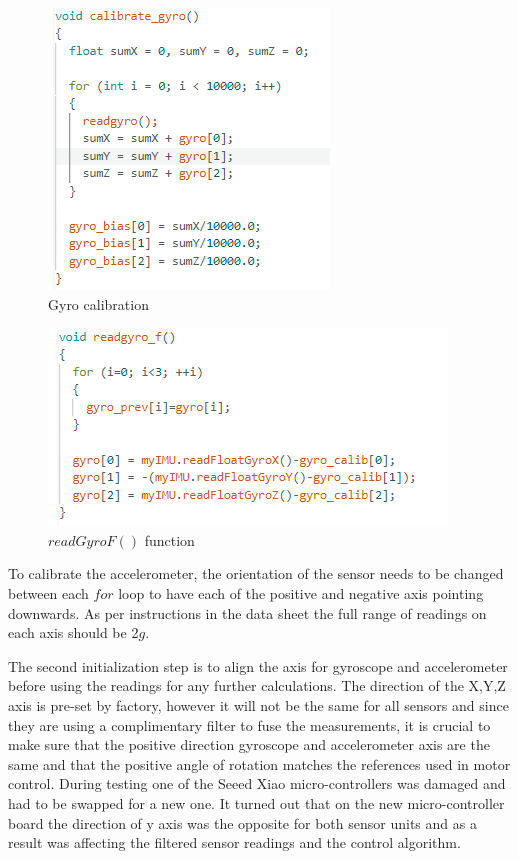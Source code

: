 \begin{figure}[H]
    \begin{center}
    \includegraphics[scale = 0.85]{pictures/IMU/gyro_calibrate.png}
    \end{center}
    \caption{Gyro calibration}
    \label{fig:my_label}
\end{figure}

\begin{figure}[H]
    \begin{center}
    \includegraphics[scale = 0.85]{pictures/IMU/read_gyro_f.png}
    \end{center}
    \caption{$readGyroF()$ function}
    \label{fig:my_label}
\end{figure}


To calibrate the accelerometer,  the orientation of the sensor needs to be changed between each $for$ loop to have each of the positive and negative axis pointing downwards. As per instructions in the data sheet the full range of readings on each axis should be 2$g$. 

The second initialization step is to align the axis for gyroscope and accelerometer before using the readings for any further calculations.
The direction of the X,Y,Z axis is pre-set by factory, however it will not be the same for all sensors and since they are using a complimentary filter to fuse the measurements, it is crucial to make sure that the positive direction gyroscope and accelerometer axis are the same and that the positive angle of rotation matches the references used in motor control. \newline
During testing one of the Seeed Xiao micro-controllers was damaged and had to be swapped for a new one. It turned out that on the new micro-controller board the direction of y axis was the opposite for both sensor units and as a result was affecting the filtered sensor readings and the control algorithm. \newline

